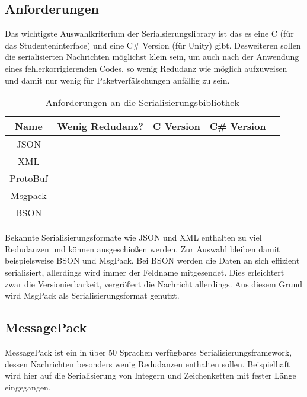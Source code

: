 \documentclass[
    12pt,
    bibliography=totoc,
    ngerman,
    enabledeprecatedfontcommands
]{scrartcl}
\newcommand{\xmark}{\text{\sffamily X}} %
\begin{document}
\subsection{Anforderungen}
Das wichtigste Auswahlkriterium der Serialsierungslibrary ist das es eine C (f{\"{u}}r das Studenteninterface) und eine C\# Version (f{\"{u}}r Unity) gibt.
Desweiteren sollen die serialisierten Nachrichten m{\"{o}}glichst klein sein, um auch nach der Anwendung
eines fehlerkorrigierenden Codes, so wenig Redudanz wie m{\"{o}}glich aufzuweisen und damit nur wenig f{\"{u}}r Paketverf{\"{a}}lschungen anf{\"{a}}llig zu sein.

\begin{table}[h]
\centering
\begin{tabu}{c | c | c | c | p{5cm}}
	\toprule
	Name & Wenig Redudanz? & C Version & C\# Version \\
	\midrule
	JSON & \xmark & \checkmark & \checkmark \\
	XML & \xmark & \checkmark & \checkmark \\
	ProtoBuf & \checkmark & \xmark\footnotemark & \checkmark \\
	Msgpack\cite{msgpack} & \checkmark & \checkmark & \checkmark \\
	BSON & \checkmark & \checkmark & \checkmark \\
	\bottomrule
\end{tabu}
\caption{Anforderungen an die Serialisierungsbibliothek}
\end{table}

Bekannte Serialisierungsformate wie JSON und XML enthalten zu viel Redudanzen und k{\"{o}}nnen ausgeschio{\ss}en werden. Zur Auswahl bleiben damit beispielsweise BSON und MsgPack.
Bei BSON werden die Daten an sich effizient serialisiert, allerdings wird immer der Feldname mitgesendet. Dies erleichtert zwar die Versionierbarkeit, vergr{\"{o}}{\ss}ert
die Nachricht allerdings. Aus diesem Grund wird MsgPack als Serialisierungsformat genutzt.

\subsection{MessagePack}
MessagePack ist ein in {\"{u}}ber 50 Sprachen verf{\"{u}}gbares Serialisierungsframework, dessen Nachrichten besonders wenig Redudanzen enthalten sollen. Beispielhaft wird hier auf die Serialisierung von
Integern und Zeichenketten mit fester L{\"{a}}nge eingegangen.
\end{document}

